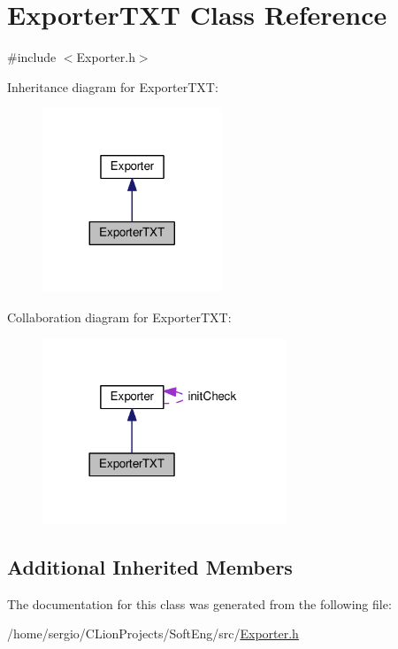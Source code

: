 \hypertarget{class_exporter_t_x_t}{}\section{Exporter\+T\+XT Class Reference}
\label{class_exporter_t_x_t}


{\ttfamily \#include $<$Exporter.\+h$>$}



Inheritance diagram for Exporter\+T\+XT\+:
\nopagebreak
\begin{figure}[H]
\begin{center}
\leavevmode
\includegraphics[width=152pt]{class_exporter_t_x_t__inherit__graph}
\end{center}
\end{figure}


Collaboration diagram for Exporter\+T\+XT\+:
\nopagebreak
\begin{figure}[H]
\begin{center}
\leavevmode
\includegraphics[width=206pt]{class_exporter_t_x_t__coll__graph}
\end{center}
\end{figure}
\subsection*{Additional Inherited Members}


The documentation for this class was generated from the following file\+:\begin{DoxyCompactItemize}
\item 
/home/sergio/\+C\+Lion\+Projects/\+Soft\+Eng/src/\hyperlink{_exporter_8h}{Exporter.\+h}\end{DoxyCompactItemize}
